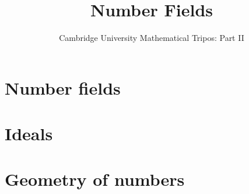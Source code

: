 \documentclass{article}
\title{Number Fields}
\author{Cambridge University Mathematical Tripos: Part II}
\begin{document}
\maketitle

\tableofcontentsnewpage{}

\section{Number fields}

\section{Ideals}

\section{Geometry of numbers}

\end{document}
